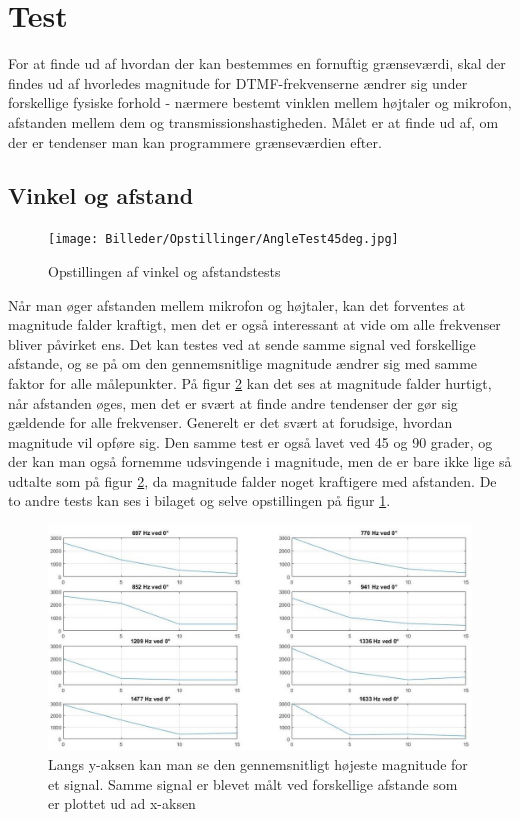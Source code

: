 \section{Test}

For at finde ud af hvordan der kan bestemmes en fornuftig grænseværdi, skal der findes ud af hvorledes magnitude for DTMF-frekvenserne ændrer sig under forskellige fysiske forhold - nærmere bestemt vinklen mellem højtaler og mikrofon, afstanden mellem dem og transmissionshastigheden. Målet er at finde ud af, om der er tendenser man kan programmere grænseværdien efter. 

\subsection{Vinkel og afstand} \label{sec:afstand}

\begin{figure}[h!]
\centering
\texttt{[image: Billeder/Opstillinger/AngleTest45deg.jpg]}
\caption{Opstillingen af vinkel og afstandstests}
\label{fig:opstilling}
\end{figure} 

Når man øger afstanden mellem mikrofon og højtaler, kan det forventes at magnitude falder kraftigt, men det er også interessant at vide om alle frekvenser bliver påvirket ens. Det kan testes ved at sende samme signal ved forskellige afstande, og se på om den gennemsnitlige magnitude ændrer sig med samme faktor for alle målepunkter. På figur \ref{fig:degrees} kan det ses at magnitude falder hurtigt, når afstanden øges, men det er svært at finde andre tendenser der gør sig gældende for alle frekvenser. Generelt er det svært at forudsige, hvordan magnitude vil opføre sig. Den samme test er også lavet ved 45 og 90 grader, og der kan man også fornemme udsvingende i magnitude, men de er bare ikke lige så udtalte som på figur \ref{fig:degrees}, da magnitude falder noget kraftigere med afstanden. De to andre tests kan ses i bilaget og selve opstillingen på figur \ref{fig:opstilling}.

\begin{figure}[h!]
\centering
\includegraphics[scale=0.5]{Billeder/0degrees.jpg}
\caption{Langs y-aksen kan man se den gennemsnitligt højeste magnitude for et signal. Samme signal er blevet målt ved forskellige afstande som er plottet ud ad x-aksen}
\label{fig:degrees}
\end{figure} 

